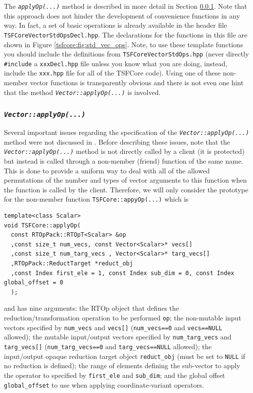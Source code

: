 The \texttt{\textit{applyOp(\-...)}}  method is described in more detail
in Section \ref{tsfcore:sec:vec_apply_op}.  Note that this approach
does not hinder the development of convenience functions in any way.
In fact, a set of basic operations is already available in the header
file \texttt{TSFCore\-Vector\-Std\-Ops\-Decl.hpp}.  The declarations for the
functions in this file are shown in Figure
\ref{tsfcore:fig:std_vec_ops}.  Note, to use these template functions
you should include the definitions from
\texttt{TSFCore\-Vector\-Std\-Ops.hpp} (never directly \texttt{\#include} a
\texttt{xxxDecl.hpp} file unless you know what you
are doing, instead, include the \texttt{xxx.hpp} file for all of the
TSFCore code).  Using one of these non-member vector functions is
transparently obvious and there is not even one hint that the method
\texttt{\textit{Vector::applyOp(\-...)}} is involved.

%
\subsubsection{\texttt{\textit{Vector::applyOp(\-...)}}}
\label{tsfcore:sec:vec_apply_op}
%

Several important issues regarding the specification of the
\texttt{\textit{Vector::applyOp(\-...)}} method were not discussed in
\cite{ref:rtop_toms}.  Before describing these issues, note that the
\texttt{\textit{Vector\-::applyOp(\-...)}} method is not directly called
by a client (it is protected) but instead is called through a
non-member (friend) function of the same name.  This is done to
provide a uniform way to deal with all of the allowed permutations of
the number and types of vector arguments to this function when the
function is called by the client.  Therefore, we will only consider
the prototype for the non-member function
\texttt{TSFCore::appyOp(...)}  which is

{\scriptsize\begin{verbatim}
template<class Scalar>
void TSFCore::applyOp(
  const RTOpPack::RTOpT<Scalar> &op
  ,const size_t num_vecs, const Vector<Scalar>* vecs[]
  ,const size_t num_targ_vecs , Vector<Scalar>* targ_vecs[]
  ,RTOpPack::ReductTarget *reduct_obj
  ,const Index first_ele = 1, const Index sub_dim = 0, const Index global_offset = 0
  );
\end{verbatim}}

{}\noindent{}and has nine arguments: the RTOp object that defines the
reduction/transformation operation to be performed \texttt{op}; the
non-mutable input vectors specified by \texttt{num\_vecs} and
\texttt{vecs[]} (\texttt{num\_vecs==0} and \texttt{vecs==NULL}
allowed); the mutable input/output vectors specified by
\texttt{num\_targ\_vecs} and \texttt{targ\-\_vecs[]}
(\texttt{num\_targ\_vecs==0} and \texttt{targ\_vecs==NULL} allowed);
the input/output opaque reduction target object \texttt{reduct\_obj}
(must be set to {}\texttt{NULL} if no reduction is defined); the range
of elements defining the sub-vector to apply the operator to specified
by \texttt{first\_ele} and
\texttt{sub\_dim}; and the global offset \texttt{global\_offset} to
use when applying coordinate-variant operators.

